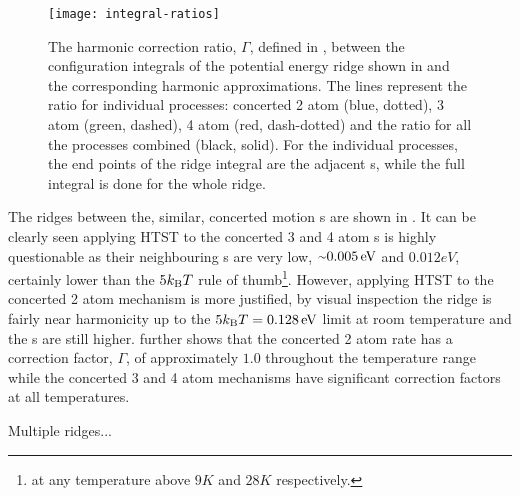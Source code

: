 \begin{figure}[hb]
\begin{center}
\texttt{[image: integral-ratios]}
\caption{
The harmonic correction ratio, $\Gamma$, defined in ,
between the configuration integrals of the potential energy ridge shown in  and the corresponding harmonic approximations.
The lines represent the ratio for individual processes: concerted 2 atom (blue, dotted), 3 atom (green, dashed), 4 atom (red, dash-dotted) and the ratio for all the processes combined (black, solid).
For the individual processes, the end points of the ridge integral are the adjacent s, while the full integral is done for the whole ridge.
}
\label{fig:integral-ratios}
\end{center}
\end{figure}

The ridges between the, similar, concerted motion s are shown in .
It can be clearly seen applying HTST to the concerted 3 and 4 atom s is highly questionable as their neighbouring s are very low, $\mytilde 0.005\unit{eV}$ and $0.012\unit{eV}$, certainly lower than the $5k_\text{B} T$ rule of thumb\footnote{at any temperature above $9\unit{K}$ and $28\unit{K}$ respectively.}.
However, applying HTST to the concerted 2 atom mechanism is more justified, by visual inspection the ridge is fairly near harmonicity up to the $5k_\text{B} T = 0.128\, \mathrm{eV}$ limit at room temperature and the s are still higher.
 further shows that the concerted 2 atom rate has a correction factor, $\Gamma$, of approximately $1.0$ throughout the temperature range while the concerted 3 and 4 atom mechanisms have significant correction factors at all temperatures.


\bit
\item Multiple ridges...
\eit

